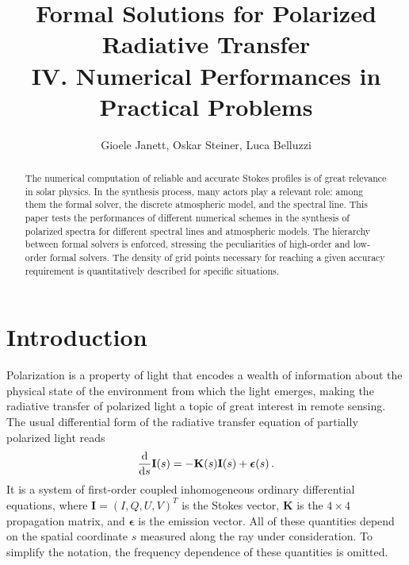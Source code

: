 \documentclass[iop,numberedappendix,twocolappendix,twocolumn]{emulateapj}
\begin{document}
 
\title{\bf Formal Solutions for Polarized Radiative Transfer\\ IV. Numerical Performances in Practical Problems}
\author{Gioele Janett, Oskar Steiner, Luca Belluzzi}%


\begin{abstract}
The numerical computation of reliable and accurate Stokes profiles is of great relevance in solar physics.
In the synthesis process, many actors play a relevant role: among them the formal solver, the discrete atmospheric model, and the spectral line.
This paper tests the performances of different numerical schemes in the synthesis of polarized spectra for different spectral lines and atmospheric models.
The hierarchy between formal solvers is enforced, stressing the peculiarities of high-order and low-order formal solvers.
The density of grid points necessary for reaching a given accuracy requirement is quantitatively described for specific situations.
\end{abstract}


\section{Introduction}\label{sec:sec1}
%
Polarization is a property of light that encodes a wealth of information about the physical state of the environment from which the light emerges, making the radiative transfer of polarized light a topic of great interest in remote sensing. The usual differential form of the radiative transfer equation of partially polarized light reads
%
\begin{equation}
  \frac{\rm d}{{\rm d} s}\mathbf I(s) 
  = -\mathbf K(s)\mathbf I(s) + \boldsymbol{\epsilon}(s)\,.
\label{eq:RTE}
\end{equation}
%
It is a system of first-order coupled inhomogeneous ordinary differential equations, where $\mathbf I=(I,Q,U,V)^{T}$ is the Stokes vector, $\mathbf K$ is the $4\times4$ propagation matrix, and $\boldsymbol{\epsilon}$ is the emission vector. All of these quantities depend on the spatial coordinate $s$ measured along the ray under consideration. 
To simplify the notation, the frequency dependence of these
quantities is omitted.
\end{document}
